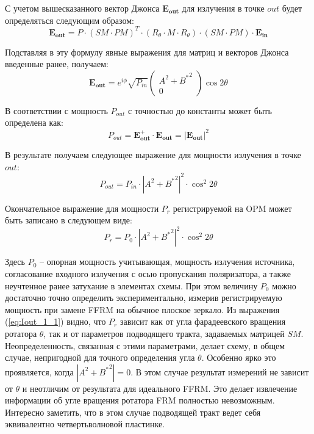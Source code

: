 \documentclass{article}
\begin{document}
С учетом вышесказанного вектор Джонса $\bm{E_{out}}$ для излучения в точке $out$ будет определяться следующим образом:
\begin{equation}
	\bm{E_{out}} =P \cdot (SM\cdot PM)^T\cdot (R_\theta \cdot M \cdot R_\theta)\cdot (SM\cdot PM)\cdot \bm{E_{in}}
\end{equation}	

Подставляя в эту формулу явные выражения для матриц и векторов Джонса введенные ранее, получаем:
\begin{equation}
	\bm{E_{out}} =  e^{i\phi} \sqrt{P_{in}} \begin{pmatrix} A^2 + {B^*}^2 \\ 0 \end{pmatrix}\cos 2 \theta
\end{equation}

В соответствии с \autocite{azzamEllipsometryPolarizedLight1977} мощность $P_{out}$ с точностью до константы может быть определена как: 	
\begin{equation}
	P_{out} = \bm{E_{out}^+} \cdot \bm{E_{out}} = \left|\bm{E_{out}} \right|^2 
\end{equation}

В результате получаем следующее выражение для мощности излучения в точке $out$:
\begin{equation}
	P_{out} = P_{in} \cdot \left| A^2 + {B^*}^2 \right|^2 \cdot \cos^2 2 \theta
\end{equation}

Окончательное выражение для мощности $P_r$ регистрируемой на OPM может быть записано в следующем виде:
\begin{equation}
	\label{eq:Iout_1_1}
	P_{r} = P_0 \cdot \left| A^2 + {B^*}^2 \right|^2 \cdot \cos^2 2 \theta
\end{equation}

Здесь $P_0$ – опорная мощность учитывающая, мощность излучения источника, согласование входного излучения с осью пропускания поляризатора, а также неучтенное ранее затухание в элементах схемы. При этом величину $P_0$ можно достаточно точно определить экспериментально, измерив регистрируемую мощность при замене FFRM на обычное плоское зеркало. Из выражения (\ref{eq:Iout_1_1}) видно, что $P_{r}$ зависит как от угла фарадеевского вращения ротатора $\theta$, так и от параметров подводящего тракта, задаваемых матрицей $SM$. Неопределенность, связанная с этими параметрами, делает схему, в общем случае, непригодной для точного определения угла $\theta$.  Особенно ярко это проявляется, когда  $\left| A^2 + {B^*}^2 \right|=0$. В этом случае результат измерений не зависит от $\theta$ и неотличим от результата для идеального FFRM. Это делает извлечение информации об угле вращения ротатора FRM полностью невозможным. Интересно заметить, что в этом случае подводящей тракт ведет себя эквивалентно четвертьволновой пластинке. 
\end{document}
